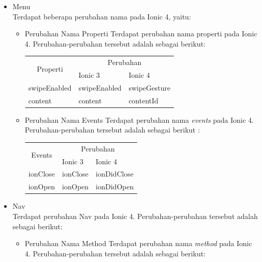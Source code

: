\begin{enumerate}
\begin{enumerate}
\begin{itemize}
\begin{itemize}
				\item Menu \\
				Terdapat beberapa perubahan nama pada Ionic 4, yaitu:
				\begin{itemize}
					\item Perubahan Nama Properti
					Terdapat perubahan nama properti pada Ionic 4. Perubahan-perubahan tersebut adalah sebagai berikut:
\begin{table}[H]
\centering
\begin{tabular}{|p{4cm}|p{4cm}|p{4cm}|}
  \hline
  \multicolumn{1}{|c|}{\multirow{2}{*}{Properti}} & \multicolumn{2}{c|}{Perubahan}                   \\ \cline{2-3} 
                               					  & Ionic 3 & Ionic 4 \\ \hline
	swipeEnabled                                  & swipeEnabled & swipeGesture \\ \hline
    content                                     & content     & contentId    \\ \hline
\end{tabular}
\end{table}			

					\item Perubahan Nama Events
					Terdapat perubahan nama {\it events} pada Ionic 4. Perubahan-perubahan tersebut adalah sebagai berikut :
					
\begin{table}[H]
\centering
\begin{tabular}{|p{4cm}|p{4cm}|p{4cm}|}
  \hline
  \multicolumn{1}{|c|}{\multirow{2}{*}{Events}}   & \multicolumn{2}{c|}{Perubahan}                   \\ \cline{2-3} 
                               					  & Ionic 3      & Ionic 4 \\ \hline
	ionClose                                      & ionClose     & ionDidClose \\ \hline
    ionOpen                                       & ionOpen      & ionDidOpen    \\ \hline
\end{tabular}
\end{table}		
				\end{itemize}

				\item Nav \\
				Terdapat perubahan Nav pada Ionic 4. Perubahan-perubahan tersebut adalah sebagai berikut:
				\begin{itemize}
					\item Perubahan Nama Method 
					Terdapat perubahan nama {\it method} pada Ionic 4. Perubahan-perubahan tersebut adalah sebagai berikut:


\end{itemize}
\end{itemize}
\end{itemize}
\end{enumerate}
\end{enumerate}
